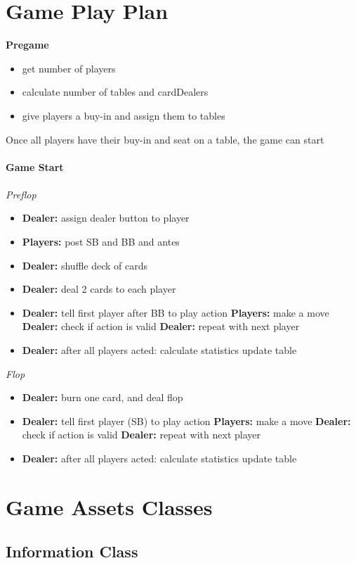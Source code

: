 \section{Game Play Plan}
\textbf{Pregame}
\begin{itemize}
\item get number of players
\item calculate number of tables and cardDealers
\item give players a buy-in and assign them to tables
\end{itemize}
Once all players have their buy-in and seat on a table, the game can start\\\\
\textbf{Game Start}\\\\
\textit{Preflop}
\begin{itemize}
\item \textbf{Dealer:} assign dealer button to player
\item \textbf{Players:} post SB and BB and antes
\item \textbf{Dealer:} shuffle deck of cards
\item \textbf{Dealer:} deal 2 cards to each player
\item \textbf{Dealer:} tell first player after BB to play action
\subitem \textbf{Players:} make a move 
\subitem \textbf{Dealer:} check if action is valid
\subitem \textbf{Dealer:} repeat with next player 
\item \textbf{Dealer:} after all players acted:
\subitem calculate statistics 
\subitem update table
\end{itemize}

\textit{Flop}
\begin{itemize}
\item \textbf{Dealer:} burn one card, and deal flop
\item \textbf{Dealer:} tell first player (SB) to play action
\subitem \textbf{Players:} make a move 
\subitem \textbf{Dealer:} check if action is valid
\subitem \textbf{Dealer:} repeat with next player 
\item \textbf{Dealer:} after all players acted:
\subitem calculate statistics 
\subitem update table
\end{itemize}
\pagebreak
\section{Game Assets Classes}
\subsection{Information Class}




\FloatBarrier\label{end-of-document}


